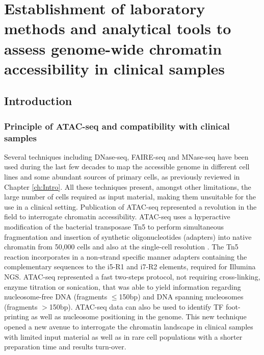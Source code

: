 \chapter{Establishment of laboratory methods and analytical tools to assess genome-wide chromatin accessibility in clinical samples}
\label{ch:Results1}


\section{Introduction}
\subsection{Principle of ATAC-seq and compatibility with clinical samples}
Several techniques including DNase-seq, FAIRE-seq and MNase-seq have been used during the last few decades to map the accessible genome in different cell lines and some abundant sources of primary cells, as previously reviewed in Chapter \ref{ch:Intro}. All these techniques present, amongst other limitations, the large number of cells required as input material, making them unsuitable for the use in a clinical setting. Publication of ATAC-seq represented a revolution in the field to interrogate chromatin accessibility. ATAC-seq uses a hyperactive modification of the bacterial transposase Tn5 to perform simultaneous fragmentation and insertion of synthetic oligonucleotides (adapters) into native chromatin from 50,000 cells and also at the single-cell resolution \parencite{Buenrostro2013, Buenrostro2015}. The Tn5 reaction incorporates in a non-strand specific manner adapters containing the complementary sequences to the i5-R1 and i7-R2 elements, required for Illumina NGS. ATAC-seq represented a fast two-steps protocol, not requiring cross-linking, enzyme titration or sonication, that was able to yield information regarding nucleosome-free DNA (fragments $\leq$150bp) and DNA spanning nucleosomes (fragments $>$150bp). ATAC-seq data can also be used to identify TF foot-printing as well as nucleosome positioning in the genome. This new technique opened a new avenue to interrogate the chromatin landscape in clinical samples with limited input material as well as in rare cell populations with a shorter preparation time and results turn-over.


